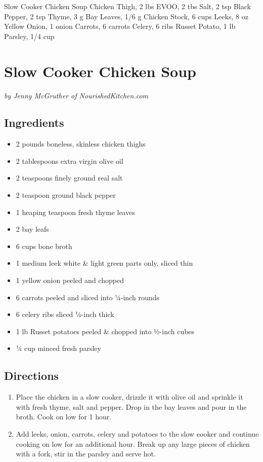 Slow Cooker Chicken Soup
  Chicken Thigh, 2 lbs
  EVOO, 2 tbs
  Salt, 2 tsp
  Black Pepper, 2 tsp
  Thyme, 3 g
  Bay Leaves, 1/6 g
  Chicken Stock, 6 cups
  Leeks, 8 oz
  Yellow Onion, 1 onion
  Carrots, 6 carrots
  Celery, 6 ribs
  Russet Potato, 1 lb
  Parsley, 1/4 cup

\section{ Slow Cooker Chicken Soup }
\textit{ by Jenny McGruther of NourishedKitchen.com }

\subsection{ Ingredients }

\begin{itemize}
  \item 2 pounds boneless, skinless chicken thighs
  \item 2 tablespoons extra virgin olive oil 
  \item 2 teaspoons finely ground real salt
  \item 2 teaspoon ground black pepper
  \item 1 heaping teaspoon fresh thyme leaves
  \item 2 bay leafs
  \item 6 cups bone broth 
  \item 1 medium leek white \& light green parts only, sliced thin
  \item 1 yellow onion peeled and chopped
  \item 6 carrots peeled and sliced into ¼-inch rounds
  \item 6 celery ribs sliced ¼-inch thick
  \item 1 lb Russet potatoes peeled \& chopped into ½-inch cubes
  \item ¼ cup minced fresh parsley
\end{itemize}

\subsection{ Directions }

\begin{enumerate}
    \item Place the chicken in a slow cooker, drizzle it with olive oil and sprinkle it with fresh thyme, salt and pepper. Drop in the bay leaves and pour in the broth. Cook on low for 1 hour.
    \item Add leeks, onion, carrots, celery and potatoes to the slow cooker and continue cooking on low for an additional hour. Break up any large pieces of chicken with a fork, stir in the parsley and serve hot.
\end{enumerate}
